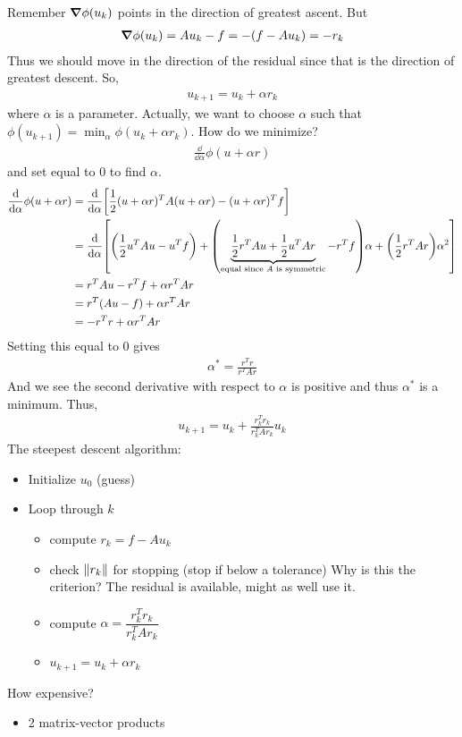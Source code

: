 \documentclass{article}
\begin{document}
    Remember $\grad\phi(u_k)$ points in the direction of greatest ascent.  But
    \begin{align*}
        \grad\phi(u_k) = Au_k - f = -(f - Au_k) = -r_k
    \end{align*}
    Thus we should move in the direction of the residual since that is the direction of greatest descent.  So,
    \begin{align*}
        u_{k+1} = u_k + \alpha r_k
    \end{align*}
    where $\alpha$ is a parameter.  Actually, we want to choose $\alpha$ such that $\phi(u_{k+1}) = \min_\alpha\phi(u_k + \alpha r_k)$.  How do we minimize?
    \begin{align*}
        \frac{\dd}{\dd\alpha}\phi(u + \alpha r)
    \end{align*}
    and set equal to $0$ to find $\alpha$.
    \begin{align*}
        \frac{\dd}{\dd\alpha}\phi(u + \alpha r) &= \frac{\dd}{\dd\alpha}\qty[\frac{1}{2}(u + \alpha r)^TA(u + \alpha r) - (u + \alpha r)^T f] \\
        &= \frac{\dd}{\dd \alpha}\qty[\qty(\frac{1}{2}u^TAu - u^Tf) + \qty(\underbrace{\frac{1}{2}r^TAu + \frac{1}{2}u^TAr}_\text{equal since $A$ is symmetric} - r^Tf)\alpha + \qty(\frac{1}{2}r^TAr)\alpha^2] \\
        &= r^TAu - r^Tf + \alpha r^TAr \\
        &= r^T(Au - f) + \alpha r^TAr \\
        &= -r^Tr + \alpha r^TAr
    \end{align*}
    Setting this equal to $0$ gives
    \begin{align*}
        \alpha^* = \frac{r^Tr}{r^TAr}
    \end{align*}
    And we see the second derivative with respect to $\alpha$ is positive and thus $\alpha^*$ is a minimum.
    Thus,
    \begin{align*}
        u_{k+1} = u_k + \frac{r_k^Tr_k}{r_k^TAr_k}u_k
    \end{align*}
    The steepest descent algorithm:
    \begin{itemize}
        \item Initialize $u_0$ (guess)
        \item Loop through $k$
        \begin{itemize}
            \item compute $r_k = f - Au_k$
            \item check $\norm{r_k}$ for stopping (stop if below a tolerance) {\color{red}Why is this the criterion?} {\color{blue} The residual is available, might as well use it.}
            \item compute $\alpha = \dfrac{r_k^Tr_k}{r_k^TAr_k}$
            \item $u_{k+1} = u_k + \alpha r_k$
        \end{itemize}
    \end{itemize}
    How expensive?
    \begin{itemize}
        \item 2 matrix-vector products
    \end{itemize}
\end{document}
